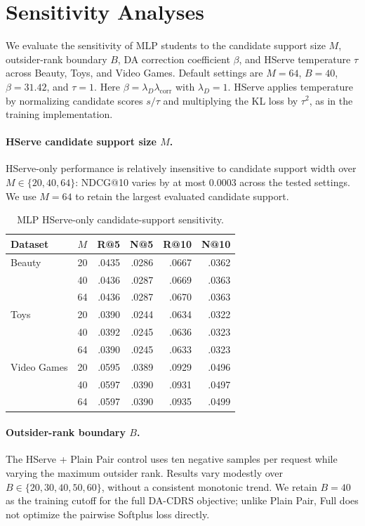 \documentclass[sigconf, anonymous, review]{acmart}
\begin{document}
\section{Sensitivity Analyses}
\label{sec:sup-sensitivity}

We evaluate the sensitivity of MLP students to the candidate
support size $M$, outsider-rank boundary $B$, DA correction
coefficient $\beta$, and HServe temperature $\tau$ across
Beauty, Toys, and Video Games. Default settings are
$M=64$, $B=40$, $\beta=31.42$, and $\tau=1$.
Here $\beta=\lambda_D\lambda_{\mathrm{corr}}$ with
$\lambda_D=1$. HServe applies temperature by normalizing
candidate scores $s/\tau$ and multiplying the KL loss by
$\tau^2$, as in the training implementation.

\paragraph{HServe candidate support size $M$.}
HServe-only performance is relatively insensitive to
candidate support width over $M\in\{20,40,64\}$:
NDCG@10 varies by at most 0.0003 across the tested settings.
We use $M=64$ to retain the largest evaluated candidate support.

\begin{table}[t]
\centering
\caption{MLP HServe-only candidate-support sensitivity.}
\label{tab:sup-sensitive-m}
\fontsize{7.1}{8.5}\selectfont
\setlength{\tabcolsep}{2.4pt}
\begin{tabular}{@{}llrrrr@{}}
\toprule
Dataset & $M$ & R@5 & N@5 & R@10 & N@10 \\
\midrule
Beauty & 20 & .0435 & .0286 & .0667 & .0362 \\
 & 40 & .0436 & .0287 & .0669 & .0363 \\
 & 64 & .0436 & .0287 & .0670 & .0363 \\
\addlinespace[2pt]
Toys & 20 & .0390 & .0244 & .0634 & .0322 \\
 & 40 & .0392 & .0245 & .0636 & .0323 \\
 & 64 & .0390 & .0245 & .0633 & .0323 \\
\addlinespace[2pt]
Video Games & 20 & .0595 & .0389 & .0929 & .0496 \\
 & 40 & .0597 & .0390 & .0931 & .0497 \\
 & 64 & .0597 & .0390 & .0935 & .0499 \\
\bottomrule
\end{tabular}
\end{table}

\paragraph{Outsider-rank boundary $B$.}
The HServe + Plain Pair control uses ten negative samples
per request while varying the maximum outsider rank.
Results vary modestly over $B\in\{20,30,40,50,60\}$,
without a consistent monotonic trend. We retain $B=40$
as the training cutoff for the full DA-CDRS objective;
unlike Plain Pair, Full does not optimize the pairwise
Softplus loss directly.
\end{document}
